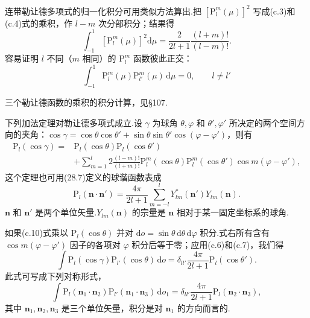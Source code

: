 连带勒让德多项式的归一化积分可用类似方法算出.把 $\left[\mathrm{P}_l^m(\mu)\right]^2$ 写成(c.3)和(c.4)式的乘积，作 $l-m$ 次分部积分；结果得
\begin{equation}
  \int_{-1}^{1}\left[\mathrm{P}_l^m(\mu)\right]^2\mathrm{d}\mu
  =\frac{2}{2l+1}\frac{(l+m)!}{(l-m)!}.
\end{equation}
容易证明 $l$ 不同（$m$ 相同）的 $\mathrm{P}_l^m$ 函数彼此正交：
\begin{equation}
  \int_{-1}^{1}\mathrm{P}_l^m(\mu)\mathrm{P}_{l'}^m(\mu)\,\mathrm{d}\mu=0,
  \qquad l\neq l'
\end{equation}

三个勒让德函数的乘积的积分计算，见§107.

下列加法定理对勒让德多项式成立.设 $\gamma$ 为球角 $\theta,\varphi$ 和 $\theta',\varphi'$ 所决定的两个空间方向的夹角：$\cos\gamma=\cos\theta\cos\theta'+\sin\theta\sin\theta'\cos(\varphi-\varphi')$，则有
\begin{equation}
\begin{aligned}
  \mathrm{P}_l(\cos\gamma)={}&\mathrm{P}_l(\cos\theta)\mathrm{P}_l(\cos\theta')\\
  &+\sum_{m=1}^{l}2\frac{(l-m)!}{(l+m)!}
  \mathrm{P}_l^m(\cos\theta)\mathrm{P}_l^m(\cos\theta')
  \cos m(\varphi-\varphi'),
\end{aligned}
\end{equation}
这个定理也可用(28.7)定义的球谐函数表成
\begin{equation}
  \mathrm{P}_l(\boldsymbol{n}\cdot\boldsymbol{n}')
  =\frac{4\pi}{2l+1}\sum_{m=-l}^{l}
  Y_{lm}^{*}(\boldsymbol{n}')Y_{lm}(\boldsymbol{n}).
\end{equation}
$\boldsymbol{n}$ 和 $\boldsymbol{n}'$ 是两个单位矢量.$Y_{lm}(\boldsymbol{n})$ 的宗量是 $\boldsymbol{n}$ 相对于某一固定坐标系的球角.

如果(c.10)式乘以 $\mathrm{P}_l(\cos\theta)$ 并对 $\mathrm{d}o=\sin\theta\,\mathrm{d}\theta\,\mathrm{d}\varphi$ 积分.式右所有含有 $\cos m(\varphi-\varphi')$ 因子的各项对 $\varphi$ 积分后等于零；应用(c.6)和(c.7)，我们得
\begin{equation*}
  \int\mathrm{P}_l(\cos\gamma)\mathrm{P}_{l'}(\cos\theta)\,\mathrm{d}o
  =\delta_{ll'}\frac{4\pi}{2l+1}\mathrm{P}_l(\cos\theta').
\end{equation*}
此式可写成下列对称形式，
\begin{equation}
  \int\mathrm{P}_l(\boldsymbol{n}_1\cdot\boldsymbol{n}_2)
  \mathrm{P}_{l'}(\boldsymbol{n}_1\cdot\boldsymbol{n}_3)\,\mathrm{d}o_1
  =\delta_{ll'}\frac{4\pi}{2l+1}
  \mathrm{P}_l(\boldsymbol{n}_2\cdot\boldsymbol{n}_3),
\end{equation}
其中 $\boldsymbol{n}_1,\boldsymbol{n}_2,\boldsymbol{n}_3$ 是三个单位矢量，积分是对 $\boldsymbol{n}_1$ 的方向而言的.

